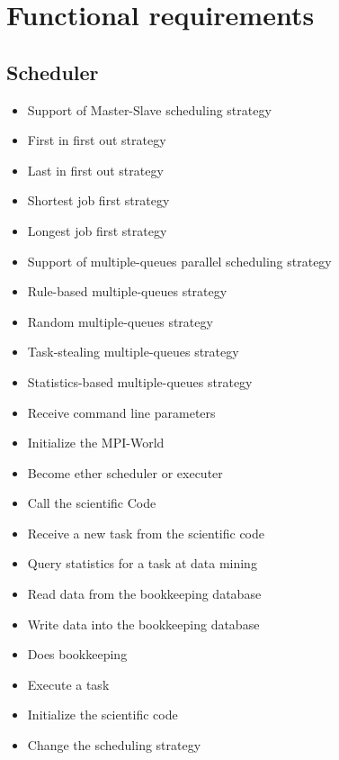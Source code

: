 {


\setcounter{func}{10}
\renewcommand{\labelitemi}{
	\ifnum \value{func}<10$/F 0\arabic{func} /$\addtocounter{func}{10}
	\else $/F \arabic{func} /$\addtocounter{func}{10}\fi
	}

\section{Functional requirements} 
	
	\subsection{Scheduler}
	
		\begin{itemize}
			\item Support of Master-Slave scheduling strategy
			\item First in first out strategy
			\item Last in first out strategy
			\item Shortest job first strategy
			\item Longest job first strategy 
			\item Support of multiple-queues parallel scheduling strategy
			\item Rule-based multiple-queues strategy
			\item Random multiple-queues strategy
			\item Task-stealing multiple-queues strategy
			\item Statistics-based multiple-queues strategy
			\item Receive command line parameters
			\item Initialize the MPI-World
			\item Become ether scheduler or executer
			\item Call the scientific Code 
			\item Receive a new task from the scientific code
			\item Query statistics for a task at data mining
			\item Read data from the bookkeeping database
			\item Write data into the bookkeeping database
			\item Does bookkeeping
			\item Execute a task
			\item Initialize the scientific code
			\item Change the scheduling strategy
		\end{itemize}
	
}
